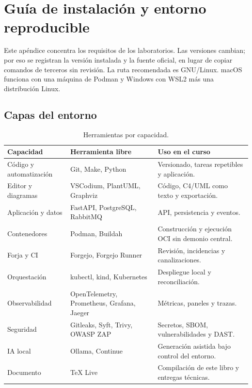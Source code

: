 \chapter{Guía de instalación y entorno reproducible}
\label{ap:instalacion}

Este apéndice concentra los requisitos de los laboratorios. Las versiones cambian; por eso se registran la versión instalada y la fuente oficial, en lugar de copiar comandos de terceros sin revisión. La ruta recomendada es GNU/Linux. macOS funciona con una máquina de Podman y Windows con WSL2 más una distribución Linux.

\section{Capas del entorno}

\begin{table}[htbp]
\centering
\caption{Herramientas por capacidad.}
\begin{tabularx}{\textwidth}{p{3cm}p{3.7cm}X}
\toprule
\textbf{Capacidad} & \textbf{Herramienta libre} & \textbf{Uso en el curso}\\
\midrule
Código y automatización & Git, Make, Python & Versionado, tareas repetibles y aplicación.\\
Editor y diagramas & VSCodium, PlantUML, Graphviz & Código, C4/UML como texto y exportación.\\
Aplicación y datos & FastAPI, PostgreSQL, RabbitMQ & API, persistencia y eventos.\\
Contenedores & Podman, Buildah & Construcción y ejecución OCI sin demonio central.\\
Forja y CI & Forgejo, Forgejo Runner & Revisión, incidencias y canalizaciones.\\
Orquestación & kubectl, kind, Kubernetes & Despliegue local y reconciliación.\\
Observabilidad & OpenTelemetry, Prometheus, Grafana, Jaeger & Métricas, paneles y trazas.\\
Seguridad & Gitleaks, Syft, Trivy, OWASP ZAP & Secretos, SBOM, vulnerabilidades y DAST.\\
IA local & Ollama, Continue & Generación asistida bajo control del entorno.\\
Documento & TeX Live & Compilación de este libro y entregas técnicas.\\
\bottomrule
\end{tabularx}
\end{table}

